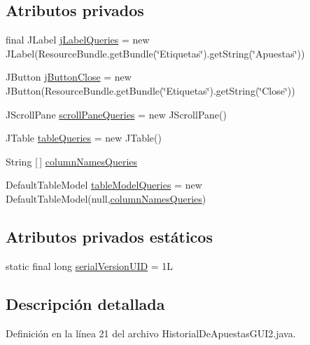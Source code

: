 \subsection*{Atributos privados}
\begin{DoxyCompactItemize}
\item 
final J\+Label \mbox{\hyperlink{classgui_1_1HistorialDeApuestasGUI2_aae87a2fe0f346121594a611e38f3080b}{j\+Label\+Queries}} = new J\+Label(Resource\+Bundle.\+get\+Bundle(\char`\"{}Etiquetas\char`\"{}).get\+String(\char`\"{}Apuestas\char`\"{}))
\item 
J\+Button \mbox{\hyperlink{classgui_1_1HistorialDeApuestasGUI2_a7ca2382644c3a4c94bc4791b302a2f58}{j\+Button\+Close}} = new J\+Button(Resource\+Bundle.\+get\+Bundle(\char`\"{}Etiquetas\char`\"{}).get\+String(\char`\"{}Close\char`\"{}))
\item 
J\+Scroll\+Pane \mbox{\hyperlink{classgui_1_1HistorialDeApuestasGUI2_a7035ed73b84b6f1e3dc4545432d460e4}{scroll\+Pane\+Queries}} = new J\+Scroll\+Pane()
\item 
J\+Table \mbox{\hyperlink{classgui_1_1HistorialDeApuestasGUI2_a56d9a2f72bffe6a90852a91306fd2386}{table\+Queries}} = new J\+Table()
\item 
String \mbox{[}$\,$\mbox{]} \mbox{\hyperlink{classgui_1_1HistorialDeApuestasGUI2_a81c02821824ec5ab32139ed7b0d7b390}{column\+Names\+Queries}}
\item 
Default\+Table\+Model \mbox{\hyperlink{classgui_1_1HistorialDeApuestasGUI2_ad72fe7f139dc7077abdc25c35b900ad0}{table\+Model\+Queries}} = new Default\+Table\+Model(null,\mbox{\hyperlink{classgui_1_1HistorialDeApuestasGUI2_a81c02821824ec5ab32139ed7b0d7b390}{column\+Names\+Queries}})
\end{DoxyCompactItemize}
\subsection*{Atributos privados estáticos}
\begin{DoxyCompactItemize}
\item 
static final long \mbox{\hyperlink{classgui_1_1HistorialDeApuestasGUI2_a9560ccd956c46b75daa8ae2f6353e6a2}{serial\+Version\+U\+ID}} = 1L
\end{DoxyCompactItemize}


\subsection{Descripción detallada}


Definición en la línea 21 del archivo Historial\+De\+Apuestas\+G\+U\+I2.\+java.




